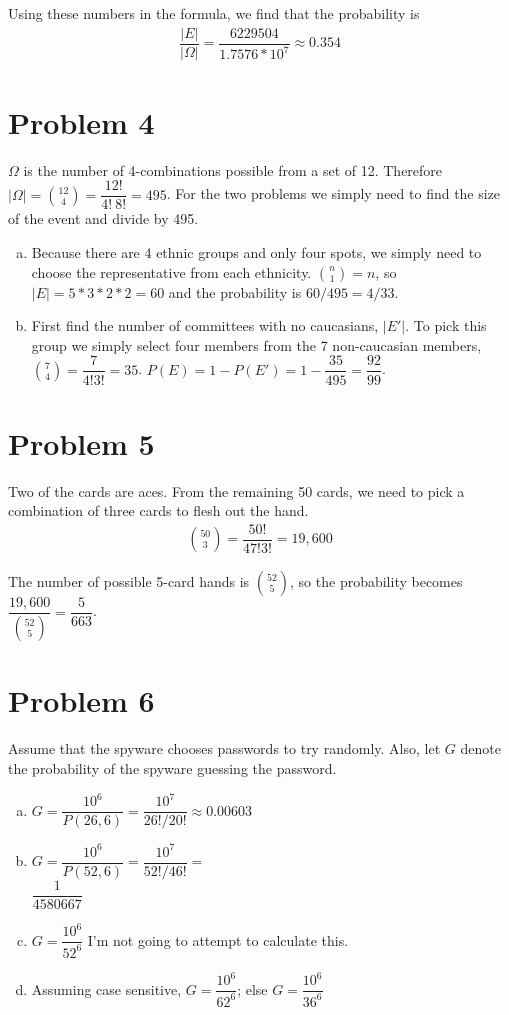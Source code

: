 \documentclass[11pt]{article}
\begin{document}
Using these numbers in the formula, we find that the probability is
	\begin{align*}
		\dfrac{|E|}{|\Omega|} = \dfrac{6229504}{1.7576 * 10^7} \approx 0 .354
	\end{align*}


\section*{Problem 4}
	$\Omega$ is the number of 4-combinations possible from a set of 12. Therefore $|\Omega| = \binom{12}{4} = \dfrac{12!}{4!\ 8!} = 495$. For the two problems we simply need to find the size of the event and divide by 495.
	
\begin{enumerate}[(a)]
	\item Because there are 4 ethnic groups and only four spots, we simply need to choose the representative from each ethnicity. $\binom{n}{1} = n$, so $|E| = 5*3*2*2 = 60$ and the probability is $60/495 = 4/33$.
	\item  First find the number of committees with no caucasians, $|E'|$. To pick this group we simply select four members from the 7 non-caucasian members, $\binom{7}{4} = \dfrac{7}{4!3!} = 35$. $P(E) = 1- P(E') = 1 - \dfrac{35}{495} = \dfrac{92}{99}$.
\end{enumerate}

\section*{Problem 5}
Two of the cards are aces. From the remaining 50 cards, we need to pick a combination of three cards to flesh out the hand.
\begin{align*}
	\binom{50}{3} = \dfrac{50!}{47!3!} =19,600
\end{align*}

The number of possible 5-card hands is $\binom{52}{5}$, so the probability becomes $\dfrac{19,600}{\binom{52}{5}} = \dfrac{5}{663}$. 

\section*{Problem 6}
Assume that the spyware chooses passwords to try randomly. Also, let $G$ denote the probability of the spyware guessing the password.

\begin{enumerate}[(a)]
	\item $G = \dfrac{10^6}{P(26, 6)} = \dfrac{10^7}{26!/20!} \approx 0.00603$
	\item $G = \dfrac{10^6}{P(52, 6)} = \dfrac{10^7}{52!/46!} =$\\
	$\dfrac{1}{4580667}$
	\item $G = \dfrac{10^6}{52^6}$ I'm not going to attempt to calculate this.
	\item Assuming case sensitive, $G = \dfrac{10^6}{62^6}$; else $G = \dfrac{10^6}{36^6}$

	
\end{enumerate}
\end{document}
